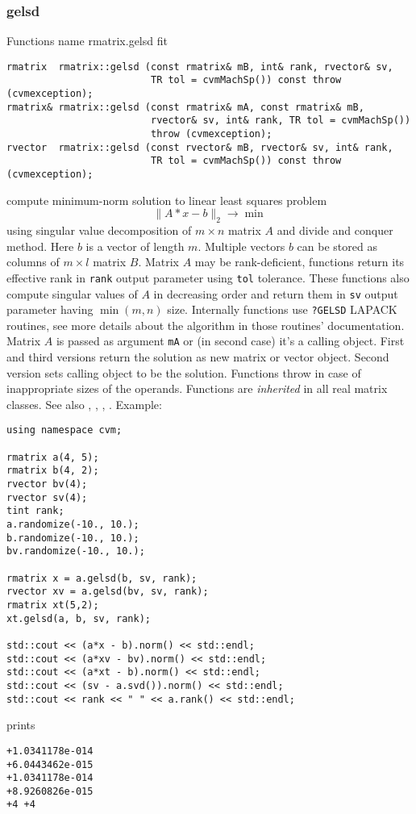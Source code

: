 \subsubsection{gelsd}
Functions%
\pdfdest name {rmatrix.gelsd} fit
\begin{verbatim}
rmatrix  rmatrix::gelsd (const rmatrix& mB, int& rank, rvector& sv,
                         TR tol = cvmMachSp()) const throw (cvmexception);
rmatrix& rmatrix::gelsd (const rmatrix& mA, const rmatrix& mB, 
                         rvector& sv, int& rank, TR tol = cvmMachSp()) 
                         throw (cvmexception);
rvector  rmatrix::gelsd (const rvector& mB, rvector& sv, int& rank,
                         TR tol = cvmMachSp()) const throw (cvmexception);
\end{verbatim}
compute minimum-norm solution to  linear
least squares problem 
\begin{equation*}
\|A*x-b\|_2\to\min
\end{equation*}
using singular value decomposition of $m\times n$ matrix $A$
and  divide and conquer method.
Here $b$ is a vector of length $m$.
Multiple vectors $b$ can be stored as columns of $m\times l$ matrix $B$.
Matrix $A$ may be rank-deficient,  functions return its effective rank in \verb"rank"
output parameter using \verb"tol" tolerance. These functions also compute 
singular values of $A$ in decreasing order and return them in \verb"sv" output parameter
having $\min(m,n)$ size.
Internally  functions use \verb"?GELSD" LAPACK routines, see more details
about the algorithm in those routines' documentation.
Matrix $A$ is passed as  argument \verb"mA" or (in second case) it's a calling object.
First and third versions return the solution as  new matrix or vector object.
Second version sets calling object to be the solution.
Functions throw
in case of inappropriate sizes of the operands.
Functions are \emph{inherited} in all real matrix classes.
See also , ,
, .
Example:

\begin{Verbatim}
using namespace cvm;

rmatrix a(4, 5);
rmatrix b(4, 2);
rvector bv(4);
rvector sv(4);
tint rank;
a.randomize(-10., 10.);
b.randomize(-10., 10.);
bv.randomize(-10., 10.);

rmatrix x = a.gelsd(b, sv, rank);
rvector xv = a.gelsd(bv, sv, rank);
rmatrix xt(5,2);
xt.gelsd(a, b, sv, rank);

std::cout << (a*x - b).norm() << std::endl;
std::cout << (a*xv - bv).norm() << std::endl;
std::cout << (a*xt - b).norm() << std::endl;
std::cout << (sv - a.svd()).norm() << std::endl;
std::cout << rank << " " << a.rank() << std::endl;
\end{Verbatim}
prints
\begin{Verbatim}
+1.0341178e-014
+6.0443462e-015
+1.0341178e-014
+8.9260826e-015
+4 +4
\end{Verbatim}
\newpage







